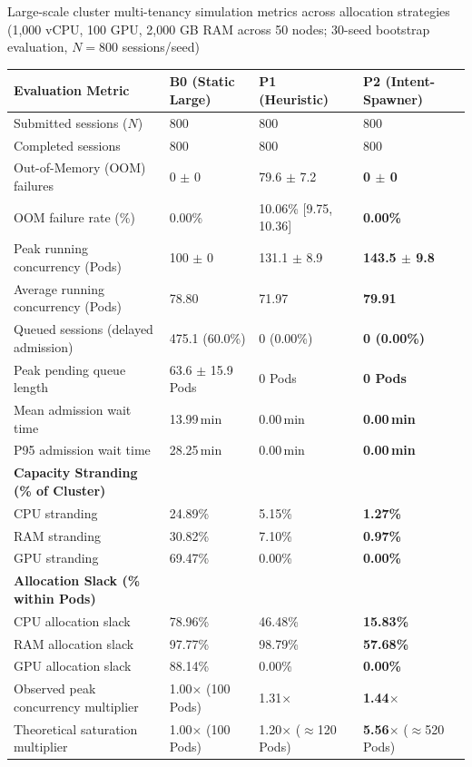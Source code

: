 \begin{table}[ht]{Large-scale cluster multi-tenancy simulation metrics across allocation strategies (1,000 vCPU, 100 GPU, 2,000 GB RAM across 50 nodes; 30-seed bootstrap evaluation, $N=800$ sessions/seed)}
\label{tab:cluster_simulation}
\centering
\small
\begin{tabular}{p{4.8cm}p{2.7cm}p{2.7cm}p{2.8cm}}
\toprule
Evaluation Metric & B0 (Static Large) & P1 (Heuristic) & P2 (Intent-Spawner) \\
\midrule
Submitted sessions ($N$) & 800 & 800 & 800 \\
Completed sessions & 800 & 800 & 800 \\
Out-of-Memory (OOM) failures & 0 $\pm$ 0 & 79.6 $\pm$ 7.2 & \textbf{0 $\pm$ 0} \\
OOM failure rate (\%) & 0.00\% & 10.06\% [9.75, 10.36] & \textbf{0.00\%} \\
Peak running concurrency (Pods) & 100 $\pm$ 0 & 131.1 $\pm$ 8.9 & \textbf{143.5 $\pm$ 9.8} \\
Average running concurrency (Pods) & 78.80 & 71.97 & \textbf{79.91} \\
Queued sessions (delayed admission) & 475.1 (60.0\%) & 0 (0.00\%) & \textbf{0 (0.00\%)} \\
Peak pending queue length & 63.6 $\pm$ 15.9 Pods & 0 Pods & \textbf{0 Pods} \\
Mean admission wait time & 13.99\,min & 0.00\,min & \textbf{0.00\,min} \\
P95 admission wait time & 28.25\,min & 0.00\,min & \textbf{0.00\,min} \\
\midrule
\textbf{Capacity Stranding (\% of Cluster)} & & & \\
\quad CPU stranding & 24.89\% & 5.15\% & \textbf{1.27\%} \\
\quad RAM stranding & 30.82\% & 7.10\% & \textbf{0.97\%} \\
\quad GPU stranding & 69.47\% & 0.00\% & \textbf{0.00\%} \\
\midrule
\textbf{Allocation Slack (\% within Pods)} & & & \\
\quad CPU allocation slack & 78.96\% & 46.48\% & \textbf{15.83\%} \\
\quad RAM allocation slack & 97.77\% & 98.79\% & \textbf{57.68\%} \\
\quad GPU allocation slack & 88.14\% & 0.00\% & \textbf{0.00\%} \\
\midrule
Observed peak concurrency multiplier & 1.00$\times$ (100 Pods) & 1.31$\times$ & \textbf{1.44$\times$} \\
Theoretical saturation multiplier & 1.00$\times$ (100 Pods) & 1.20$\times$ ($\approx$120 Pods) & \textbf{5.56$\times$} ($\approx$520 Pods) \\
\bottomrule
\end{tabular}
\end{table}
